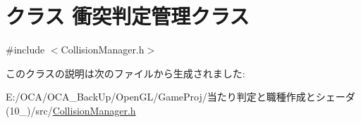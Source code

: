 \hypertarget{class_xE8_xA1_x9D_xE7_xAA_x81_xE5_x88_xA4_xE5_xAE_x9A_xE7_xAE_xA1_xE7_x90_x86_xE3_x82_xAF_xE3_x83_xA9_xE3_x82_xB9}{\section{クラス 衝突判定管理クラス}
\label{class_xE8_xA1_x9D_xE7_xAA_x81_xE5_x88_xA4_xE5_xAE_x9A_xE7_xAE_xA1_xE7_x90_x86_xE3_x82_xAF_xE3_x83_xA9_xE3_x82_xB9}
}


{\ttfamily \#include $<$Collision\-Manager.\-h$>$}



このクラスの説明は次のファイルから生成されました\-:\begin{DoxyCompactItemize}
\item 
E\-:/\-O\-C\-A/\-O\-C\-A\-\_\-\-Back\-Up/\-Open\-G\-L/\-Game\-Proj/当たり判定と職種作成とシェーダ(10\-\_)/src/\hyperlink{_collision_manager_8h}{Collision\-Manager.\-h}\end{DoxyCompactItemize}
